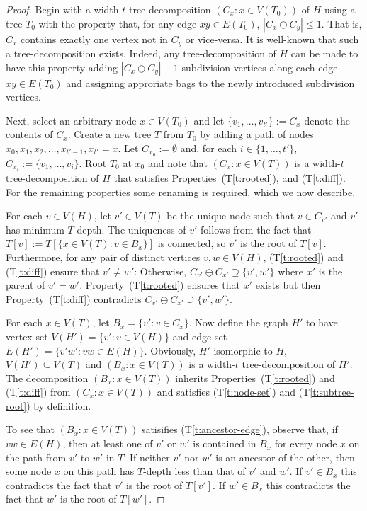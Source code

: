 \documentclass{patmorin}
\newcommand{\tref}[1]{(T\ref{t:#1})}
\begin{document}
\begin{proof}
  Begin with a width-$t$ tree-decomposition $(C_x:x\in V(T_0))$ of $H$ using a tree $T_0$ with the property that, for any edge $xy\in E(T_0)$, $|C_x\ominus C_y|\le 1$. That is, $C_x$ contains exactly one vertex not in $C_y$ or vice-versa. It is well-known that such a tree-decomposition exists.  Indeed, any tree-decomposition of $H$ can be made to have this property adding $|C_x\ominus C_y|-1$ subdivision vertices along each edge $xy\in E(T_0)$ and assigning approriate bags to the newly introduced subdivision vertices.
  
  Next, select an arbitrary node $x\in V(T_0)$ and let $\{v_1,\ldots,v_{t'}\}:=C_x$ denote the contents of $C_x$. Create a new tree $T$ from $T_0$ by adding a path of nodes $x_0,x_1,x_2,\ldots,x_{t'-1},x_{t'}=x$. Let $C_{x_0}:=\emptyset$ and, for each $i\in\{1,\ldots,t'\}$, $C_{x_i}:=\{v_1,\ldots,v_i\}$.  Root $T_0$ at $x_0$ and note that $(C_x: x\in V(T))$ is a width-$t$ tree-decomposition of $H$ that satisfies Properties~\tref{rooted}, and \tref{diff}.  For the remaining properties some renaming is required, which we now describe.
  
  For each $v\in V(H)$, let $v'\in V(T)$ be the unique node such that $v\in C_{v'}$ and $v'$ has minimum $T$-depth.  The uniqueness of $v'$ follows from the fact that $T[v]:=T[\{x\in V(T):v\in B_x\}]$ is connected, so $v'$ is the root of $T[v]$.  Furthermore, for any pair of distinct vertices $v,w\in V(H)$, \tref{rooted} and \tref{diff} ensure that $v'\neq w'$: Otherwise, $C_{v'}\ominus C_{x'}\supseteq \{v',w'\}$ where $x'$ is the parent of $v'=w'$.  Property~\tref{rooted} ensures that $x'$ exists but then Property~\tref{diff} contradicts $C_{v'}\ominus C_{x'}\supseteq \{v',w'\}$.
  
  For each $x\in V(T)$, let $B_x=\{v' : v\in C_x\}$.  Now define the graph $H'$ to have vertex set $V(H')=\{v':v\in V(H)\}$ and edge set $E(H')=\{v'w': vw\in E(H)\}$.  Obviously, $H'$ isomorphic to $H$, $V(H')\subseteq V(T)$ and $(B_x: x\in V(T))$ is a width-$t$ tree-decomposition of $H'$.  The decomposition $(B_x: x\in V(T))$ inherits Properties~\tref{rooted} and \tref{diff} from $(C_x:x\in V(T))$ and satisfies \tref{node-set} and \tref{subtree-root} by definition.
  
  To see that $(B_x:x\in V(T))$ satisifies \tref{ancestor-edge}, observe that, if $vw\in E(H)$, then at least one of $v'$ or $w'$ is contained in $B_x$ for every node $x$ on the path from $v'$ to $w'$ in $T$.  If neither $v'$ nor $w'$ is an ancestor of the other, then some node $x$ on this path has $T$-depth less than that of $v'$ and $w'$.  If $v'\in B_x$ this contradicts the fact that $v'$ is the root of $T[v']$.  If $w'\in B_x$ this contradicts the fact that $w'$ is the root of $T[w']$.
\end{proof}
\end{document}
